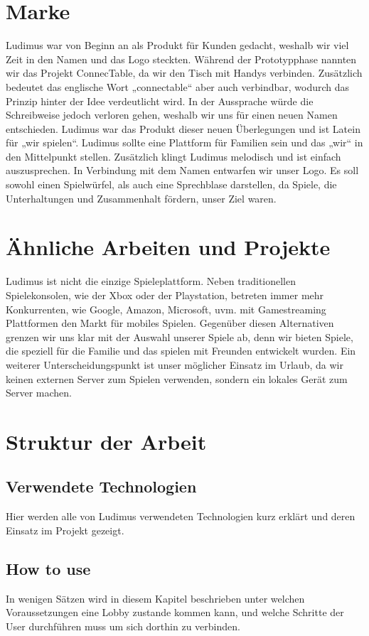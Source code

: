 \section{Marke}
Ludimus war von Beginn an als Produkt für Kunden gedacht, weshalb wir viel Zeit in den Namen und das Logo steckten. Während der Prototypphase nannten wir das Projekt ConnecTable, da wir den Tisch mit Handys verbinden. Zusätzlich bedeutet das englische Wort „connectable“ aber auch verbindbar, wodurch das Prinzip hinter der Idee verdeutlicht wird. In der Aussprache würde die Schreibweise jedoch verloren gehen, weshalb wir uns für einen neuen Namen entschieden. Ludimus war das Produkt dieser neuen Überlegungen und ist Latein für „wir spielen“. Ludimus sollte eine Plattform für Familien sein und das „wir“ in den Mittelpunkt stellen. Zusätzlich klingt Ludimus melodisch und ist einfach auszusprechen. In Verbindung mit dem Namen entwarfen wir unser Logo. Es soll sowohl einen Spielwürfel, als auch eine Sprechblase darstellen, da Spiele, die Unterhaltungen und Zusammenhalt fördern, unser Ziel waren. 


\section{Ähnliche Arbeiten und Projekte}
Ludimus ist nicht die einzige Spieleplattform. Neben traditionellen Spielekonsolen, wie der Xbox oder der Playstation, betreten immer mehr Konkurrenten, wie Google, Amazon, Microsoft, uvm. mit Gamestreaming Plattformen den Markt für mobiles Spielen. Gegenüber diesen Alternativen grenzen wir uns klar mit der Auswahl unserer Spiele ab, denn wir bieten Spiele, die speziell für die Familie und das spielen mit Freunden entwickelt wurden. Ein weiterer Unterscheidungspunkt ist unser möglicher Einsatz im Urlaub, da wir keinen externen Server zum Spielen verwenden, sondern ein lokales Gerät zum Server machen.

\section{Struktur der Arbeit}
\subsection{Verwendete Technologien}
Hier werden alle von Ludimus verwendeten Technologien kurz erklärt und deren Einsatz im Projekt gezeigt. 
\subsection{How to use}
In wenigen Sätzen wird in diesem Kapitel beschrieben unter welchen Voraussetzungen eine Lobby zustande kommen kann, und welche Schritte der User durchführen muss um sich dorthin zu verbinden.
